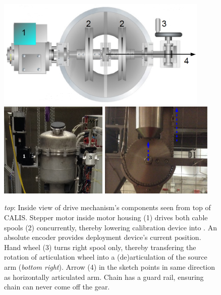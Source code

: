 \begin{figure}[htbp]
 \centering
\includegraphics[width=0.9\textwidth]{Figures/gearDrawing_withNumbers}
  \includegraphics[width=0.46\textwidth]{Figures/CALIS_head.png}
  \includegraphics[width=0.48\textwidth]{Figures/gearArticulated.png}
  \caption{\textit{top}: Inside view of drive mechanism's components seen from top of CALIS. Stepper motor inside motor housing (1) drives both cable spools (2) concurrently, thereby lowering calibration device into \lsv. An absolute encoder provides deployment device's current position. Hand wheel (3) turns right spool only, thereby transfering the rotation of articulation wheel into a (de)articulation of the source arm (\textit{bottom right}). Arrow (4) in the sketch points in same direction as horizontally articulated arm. Chain has a guard rail, ensuring chain can never come off the gear.}
  \label{fig:sourceArmRotation}
\end{figure} 

